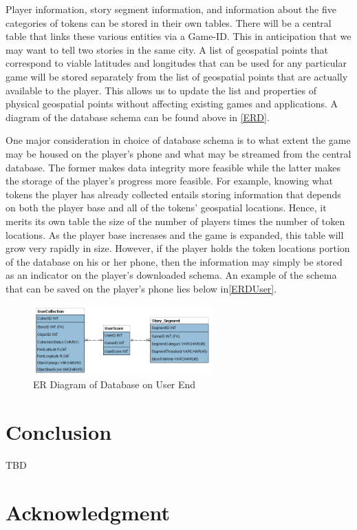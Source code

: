 \documentclass[conference]{IEEEtran}
\begin{document}
Player information, story segment information, and information about the five categories of tokens can be stored in their own tables. There will be a central table that links these various entities via a Game-ID. This in anticipation that we may want to tell two stories in the same city. A list of geospatial points that correspond to viable latitudes and longitudes that can be used for any particular game will be stored separately from the list of geospatial points that are actually available to the player. This allows us to update the list and properties of physical geospatial points without affecting existing games and applications. A diagram of the database schema can be found above in \autoref{ERD}. 

One major consideration in choice of database schema is to what extent the game may be housed on the player’s phone and what may be streamed from the central database. The former makes data integrity more feasible while the latter makes the storage of the player’s progress more feasible. For example, knowing what tokens the player has already collected entails storing information that depends on both the player base and all of the tokens’ geospatial locations. Hence, it merits its own table the size of the number of players times the number of token locations.  As the player base increases and the game is expanded, this table will grow very rapidly in size. However, if the player holds the token locations portion of the database on his or her phone, then the information may simply be stored as an indicator on the player’s downloaded schema. An example of the schema that can be saved on the player's phone lies below in\autoref{ERDUser}. 

\begin{figure}[H]
\centering
\includegraphics[width=2.7in]{imgs/MSDS7330_FinalProj_Prelim_ER2_USER.png}
\caption{ER Diagram of Database on User End}
\label{ERDUser}
\end{figure}


\section{Conclusion}
TBD

\section*{Acknowledgment}
\end{document}
